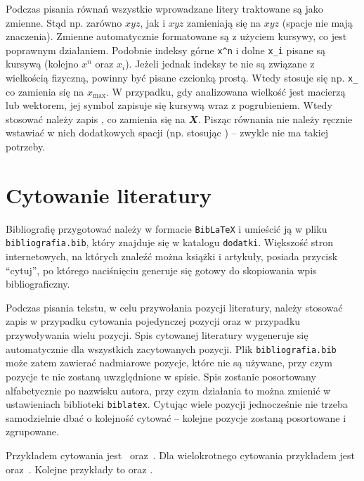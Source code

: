 Podczas pisania równań wszystkie wprowadzane litery traktowane są jako zmienne. Stąd np. zarówno \texttt{$xyz$}, jak i \texttt{$x y z$} zamieniają się na $xyz$ (spacje nie mają znaczenia). Zmienne automatycznie formatowane są z użyciem kursywy, co jest poprawnym działaniem. Podobnie indeksy górne \texttt{x^n} i dolne \texttt{x_i} pisane są kursywą (kolejno $x^n$ oraz $x_i$). Jeżeli jednak indeksy te nie są związane z wielkością fizyczną, powinny być pisane czcionką prostą. Wtedy stosuje się np. \texttt{x_{}} co zamienia się na $x_{\mathrm{max}}$. W przypadku, gdy analizowana wielkość jest macierzą lub wektorem, jej symbol zapisuje się kursywą wraz z pogrubieniem. Wtedy stosować należy zapis \texttt{}, co zamienia się na $\mathbfit{X}$. Pisząc równania nie należy ręcznie wstawiać w nich dodatkowych spacji (np. stosując \texttt{\quad}) -- zwykle nie ma takiej potrzeby.

\section{Cytowanie literatury}

Bibliografię przygotować należy w formacie \texttt{BibLaTeX} i umieścić ją w pliku \texttt{bibliografia.bib}, który znajduje się w katalogu \texttt{dodatki}. Większość stron internetowych, na których znaleźć można książki i artykuły, posiada przycisk \enquote{cytuj}, po którego naciśnięciu generuje się gotowy do skopiowania wpis bibliograficzny.

Podczas pisania tekstu, w celu przywołania pozycji literatury, należy stosować zapis \texttt{\cite{nazwa_pozycji}} w przypadku cytowania pojedynczej pozycji oraz \texttt{\cite{nazwa1, nazwa2}} w przypadku przywoływania wielu pozycji. Spis cytowanej literatury wygeneruje się automatycznie dla wszystkich zacytowanych pozycji. Plik \texttt{bibliografia.bib} może zatem zawierać nadmiarowe pozycje, które nie są używane, przy czym pozycje te nie zostaną uwzględnione w spisie. Spis zostanie posortowany alfabetycznie po nazwisku autora, przy czym działania to można zmienić w ustawieniach biblioteki \texttt{biblatex}. Cytując wiele pozycji jednocześnie nie trzeba samodzielnie dbać o kolejność cytować -- kolejne pozycje zostaną posortowane i zgrupowane.

Przykładem cytowania jest~\cite{ksiazka_1} oraz~\cite{rozdzial_ksiazki_2}. Dla wielokrotnego cytowania przykładem jest~\cite{materialy_konferencyjne_3, artykul_4, raport_5} oraz~\cite{ksiazka_1, teza_8, materialy_konferencyjne_3, artykul_4, raport_5, instrukcja_6}. Kolejne przykłady to \cite{instrukcja_6} oraz \cite{strona_7, teza_8}.

